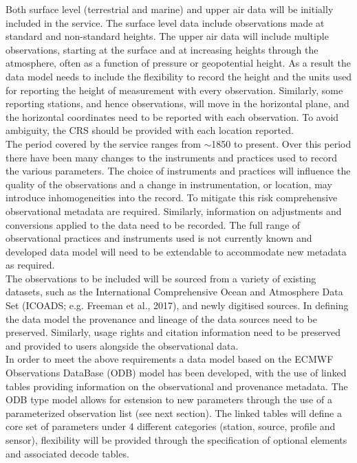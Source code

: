 \documentclass[a4paper,11pt]{article}
\begin{document}
Both surface level (terrestrial and marine) and upper air data will be initially included in the service. The surface level data include observations made at standard and non-standard heights. The upper air data will include multiple observations, starting at the surface and at increasing heights through the atmosphere, often as a function of pressure or geopotential height. As a result the data model needs to include the flexibility to record the height and the units used for reporting the height of measurement with every observation. Similarly, some reporting stations, and hence observations, will move in the horizontal plane, and the horizontal coordinates need to be reported with each observation. To avoid ambiguity, the CRS should be provided with each location reported.\\

The period covered by the service ranges from $\sim$1850 to present. Over this period there have been many changes to the instruments and practices used to record the various parameters. The choice of instruments and practices will influence the quality of the observations and a change in instrumentation, or location, may introduce inhomogeneities into the record. To mitigate this risk comprehensive observational metadata are required. Similarly, information on adjustments and conversions applied to the data need to be recorded. The full range of observational practices and instruments used is not currently known and developed data model will need to be extendable to accommodate new metadata as required.\\

The observations to be included will be sourced from a variety of existing datasets, such as the International Comprehensive Ocean and Atmosphere Data Set (ICOADS; e.g. Freeman et al., 2017), and newly digitised sources. In defining the data model the provenance and lineage of the data sources need to be preserved. Similarly, usage rights and citation information need to be preserved and provided to users alongside the observational data.\\

In order to meet the above requirements a data model based on the ECMWF Observations DataBase (ODB) model has been developed, with the use of linked tables providing information on the observational and provenance metadata. The ODB type model allows for estension to new parameters through the use of a parameterized observation list (see next section). The linked tables will define a core set of parameters under 4 different categories (station, source, profile and sensor), flexibility will be provided through the specification of optional elements and associated decode tables.\\
\end{document}

